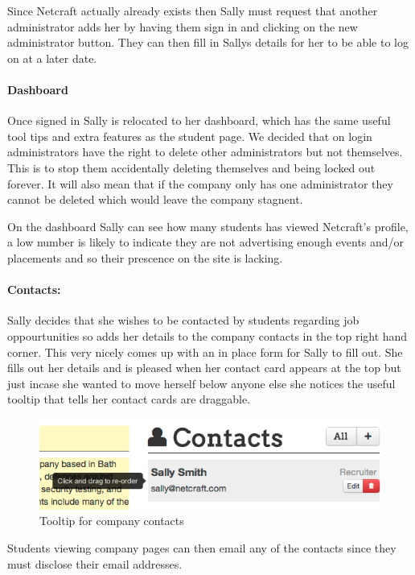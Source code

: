 
    Since Netcraft actually already exists then Sally must request that another administrator adds her by having them sign in and clicking on the new administrator button. They can then fill in Sallys details for her to be able to log on at a later date.

  \paragraph{Dashboard}
    Once signed in Sally is relocated to her dashboard, which has the same useful tool tips and extra features as the student page.
    We decided that on login administrators have the right to delete other administrators but not themselves. This is to stop them accidentally deleting themselves and being locked out forever. It will also mean that if the company only has one administrator they cannot be deleted which would leave the company stagnent.

    On the dashboard Sally can see how many students has viewed Netcraft's profile, a low number is likely to indicate they are not advertising enough events and/or placements and so their prescence on the site is lacking. 


  \paragraph{Contacts:}
    Sally decides that she wishes to be contacted by students regarding job oppourtunities so adds her details to the company contacts in the top right hand corner. This very nicely comes up with an in place form for Sally to fill out.
    She fills out her details and is pleased when her contact card appears at the top but just incase she wanted to move herself below anyone else she notices the useful tooltip that tells her contact cards are draggable.

    \begin{figure}[H]\centering
    \includegraphics[scale=0.5]{images/user_experiences/company/netcraft_company_contact_tooltip}
    \caption{Tooltip for company contacts}
    \end{figure}
    Students viewing company pages can then email any of the contacts since they must disclose their email addresses.

